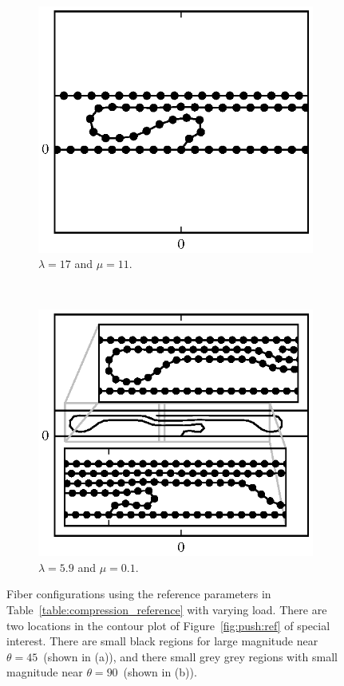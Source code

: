 	\begin{figure}[th!]
		\centering
		\begin{subfigure}{.5\textwidth}
			\centering
			\includegraphics{./fig/ch3/push/ref/l17_m11.eps}
			\caption{$\lambda=17$ and $\mu=11$.\label{subfig:tight_loop}}
		\end{subfigure}%
		~
		\begin{subfigure}{.5\textwidth}
			\centering
			\includegraphics{./fig/ch3/push/ref/l5.9_m0.1.eps}
			\caption{$\lambda=5.9$ and $\mu=0.1$.\label{subfig:tight_hairpin}}
		\end{subfigure}
		\caption{Fiber configurations using the reference parameters in Table~\ref{table:compression_reference} with varying load. There are two locations in the contour plot of Figure~\ref{fig:push:ref} of special interest. There are small black regions for large magnitude near $\theta = 45$\textdegree\ (shown in (a)), and there small grey grey regions with small magnitude near $\theta = 90$\textdegree\ (shown in (b)).\label{fig:ref_special}}
	\end{figure}

